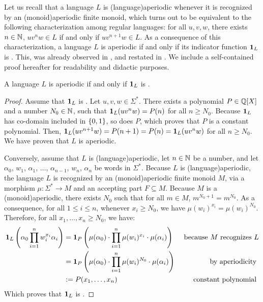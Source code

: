 Let us recall that a language $L$ is \intro(language){aperiodic} whenever it is
recognized by an \kl(monoid){aperiodic} finite monoid, which turns out to be
equivalent to the following characterization among regular languages: for all
$u,v,w$, there exists $n \in \mathbb{N}$, $u v^n w \in L$ if and only if $u v^{n+1} w
\in L$. As a consequence of this characterization, a language $L$ is aperiodic
if and only if its indicator function $\mathbf{1}_{L}$ is .
This, was already observed in \cite[Claim V.6]{CDTL23}, and restated in
\cite[Claim 7.45, Lemma 7.53]{DOUE23}. We include a self-contained proof
hereafter for readability and didactic purposes. 

\begin{example}
    \label{aperidic-ultimately-polynomial:ex}
    A language $L$ is aperiodic if and only if 
    $\mathbf{1}_{L}$ is .
\end{example}
\begin{proof}
    Assume that $\mathbf{1}_{L}$ is . Let $u,v,w \in
    \Sigma^*$. There exists a polynomial $P \in \mathbb{Q}[X]$ and a number $N_0 \in
    \mathbb{N}$, such that $\mathbf{1}_{L}(u v^n w) = P(n)$ for all $n \geq N_0$. Because
    $\mathbf{1}_{L}$ has co-domain included in $\mathopen{\{} 0,1 \mathclose{\}}$, so does $P$, which proves
    that $P$ is a constant polynomial. Then, $\mathbf{1}_{L}(u v^{n+1} w) = P(n+1) =
    P(n) = \mathbf{1}_{L}(uv^n w)$ for all $n \geq N_0$. We have proven that $L$
    is aperiodic.

    Conversely, assume that $L$ is \kl(language){aperiodic}, let $n \in \mathbb{N}$ be a number, and
    let $\alpha_0$, $w_1$, $\alpha_1$, $\ldots$, $\alpha_{n-1}$, $w_n$, $\alpha_n$
    be words in $\Sigma^*$. Because $L$ is \kl(language){aperiodic}, the language
    $L$ is recognized by an \kl(monoid){aperiodic} finite monoid $M$, via a
    morphism $\mu \colon \Sigma^* \to M$ and an accepting part $F \subseteq M$.
    Because $M$ is a \kl(monoid){aperiodic}, there exists $N_0$
    such that for all $m \in M$, $m^{N_0+1} = m^{N_0}$. As a consequence,
    for all $1 \leq i \leq n$,
    whenever $x_i \geq N_0$, we have $\mu(w_i)^{x_i} = \mu(w_i)^{N_0}$.
    Therefore, for all $x_1, \dots, x_n \geq N_0$, we have:
    \begin{align*}
        \mathbf{1}_{L}\left(\alpha_0 \prod_{i= 1}^n w_i^{x_i} \alpha_i \right) 
        &= 
        \mathbf{1}_{P}\left(\mu(\alpha_0) \cdot \prod_{i= 1}^n \mu(w_i)^{x_i} \cdot \mu(\alpha_i)\right)
        & \text{ because $M$ recognizes $L$}
        \\
        &= 
        \mathbf{1}_{P}\left(\mu(\alpha_0) \cdot \prod_{i= 1}^n \mu(w_i)^{N_0} \cdot \mu(\alpha_i)\right)
        & \text{ by aperiodicity }
        \\
        &\mathrel{:=} P(x_1, \dots, x_n) & \text{ constant polynomial }
    \end{align*}
    Which proves that $\mathbf{1}_{L}$ is .
\end{proof}

